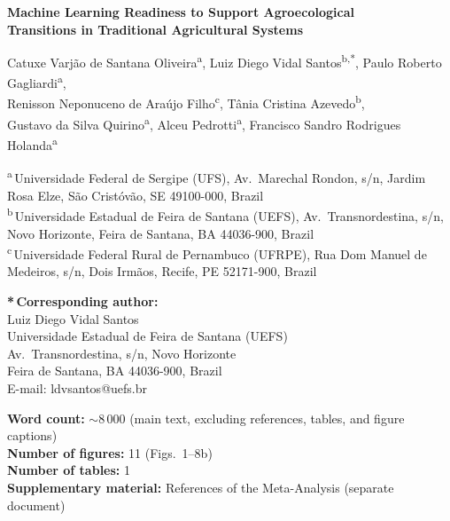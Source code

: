 \documentclass[12pt]{article}
\begin{document}
\begin{center}

{\LARGE\bfseries Machine Learning Readiness to Support Agroecological\\[4pt]
Transitions in Traditional Agricultural Systems}

\vspace{24pt}

{\large
Catuxe Varjão de Santana Oliveira\textsuperscript{a},\quad
Luiz Diego Vidal Santos\textsuperscript{b,*},\quad
Paulo Roberto Gagliardi\textsuperscript{a},\\[6pt]
Renisson Neponuceno de Araújo Filho\textsuperscript{c},\quad
Tânia Cristina Azevedo\textsuperscript{b},\\[6pt]
Gustavo da Silva Quirino\textsuperscript{a},\quad
Alceu Pedrotti\textsuperscript{a},\quad
Francisco Sandro Rodrigues Holanda\textsuperscript{a}
}

\vspace{18pt}

\end{center}

\noindent
\textsuperscript{a}\,Universidade Federal de Sergipe (UFS), Av.\ Marechal Rondon, s/n, Jardim Rosa Elze, São Cristóvão, SE 49100-000, Brazil\\[4pt]
\textsuperscript{b}\,Universidade Estadual de Feira de Santana (UEFS), Av.\ Transnordestina, s/n, Novo Horizonte, Feira de Santana, BA 44036-900, Brazil\\[4pt]
\textsuperscript{c}\,Universidade Federal Rural de Pernambuco (UFRPE), Rua Dom Manuel de Medeiros, s/n, Dois Irmãos, Recife, PE 52171-900, Brazil

\vspace{18pt}

\noindent
\textbf{*\,Corresponding author:}\\
Luiz Diego Vidal Santos\\
Universidade Estadual de Feira de Santana (UEFS)\\
Av.\ Transnordestina, s/n, Novo Horizonte\\
Feira de Santana, BA 44036-900, Brazil\\
E-mail: ldvsantos@uefs.br

\vspace{24pt}

\noindent
\textbf{Word count:} $\sim$8\,000 (main text, excluding references, tables, and figure captions)\\[4pt]
\textbf{Number of figures:} 11 (Figs.\ 1--8b)\\[4pt]
\textbf{Number of tables:} 1\\[4pt]
\textbf{Supplementary material:} References of the Meta-Analysis (separate document)
\end{document}
